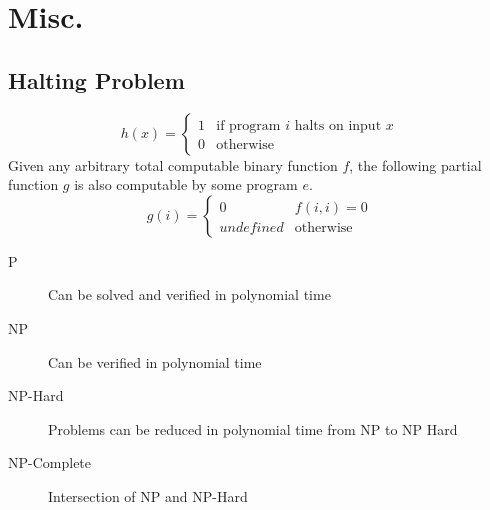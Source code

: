 \documentclass[a4paper]{article}
\begin{document}
\section{Misc.}
\subsection{Halting Problem}
\begin{displaymath}
    h(x) = \left\{
        \begin{array}{lr}
            1 & \text{if program $i$ halts on input $x$}\\
            0 & \text{otherwise}
        \end{array}
    \right.
\end{displaymath}
Given any arbitrary total computable binary function $f$, the following partial function $g$ is also computable by some program $e$.
\begin{displaymath}
    g(i) = \left\{
        \begin{array}{lr}
            0 & f(i, i) = 0\\
            undefined & \text{otherwise}
        \end{array}
    \right.
\end{displaymath}
\begin{description}
    \item[P] Can be solved and verified in polynomial time
    \item[NP] Can be verified in polynomial time
    \item[NP-Hard] Problems can be reduced in polynomial time from NP to NP Hard
    \item[NP-Complete] Intersection of NP and NP-Hard
\end{description}
\end{document}
